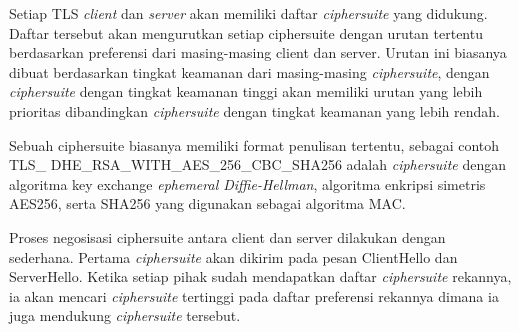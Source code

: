 Setiap TLS \textit{client} dan \textit{server} akan memiliki daftar \textit{ciphersuite} yang didukung. Daftar tersebut akan mengurutkan setiap ciphersuite dengan urutan tertentu berdasarkan preferensi dari masing-masing client dan server. Urutan ini biasanya dibuat berdasarkan tingkat keamanan dari masing-masing \textit{ciphersuite}, dengan \textit{ciphersuite} dengan tingkat keamanan tinggi akan memiliki urutan yang lebih prioritas dibandingkan \textit{ciphersuite} dengan tingkat keamanan yang lebih rendah.

Sebuah ciphersuite biasanya memiliki format penulisan tertentu, sebagai contoh TLS\_ DHE\_RSA\_WITH\_AES\_256\_CBC\_SHA256 adalah \textit{ciphersuite} dengan algoritma key exchange \textit{ephemeral Diffie-Hellman}, algoritma enkripsi simetris AES256, serta SHA256 yang digunakan sebagai algoritma MAC.

Proses negosisasi ciphersuite antara client dan server dilakukan dengan sederhana. Pertama \textit{ciphersuite} akan dikirim pada pesan ClientHello dan ServerHello. Ketika setiap pihak sudah mendapatkan daftar \textit{ciphersuite} rekannya, ia akan mencari \textit{ciphersuite} tertinggi pada daftar preferensi rekannya dimana ia juga mendukung \textit{ciphersuite} tersebut.
